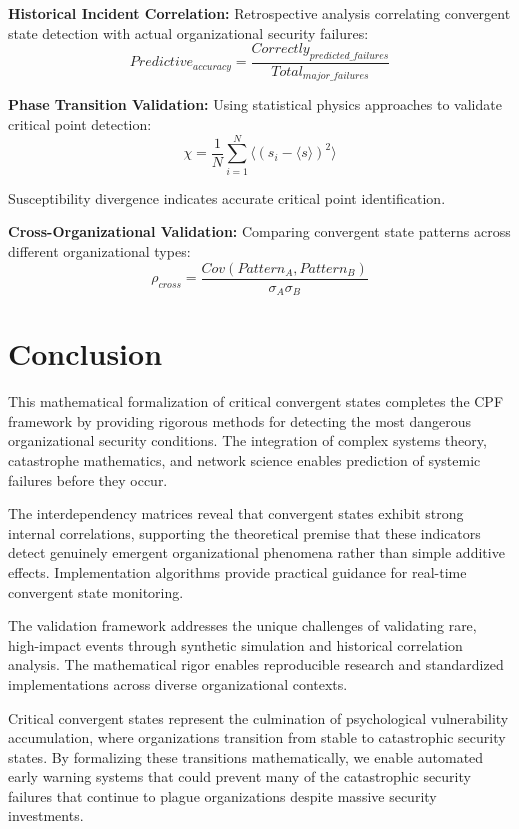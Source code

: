 \documentclass[11pt,a4paper]{article}
\begin{document}
\textbf{Historical Incident Correlation:}
Retrospective analysis correlating convergent state detection with actual organizational security failures:
\begin{equation}
Predictive_{accuracy} = \frac{Correctly_{predicted\_failures}}{Total_{major\_failures}}
\end{equation}

\textbf{Phase Transition Validation:}
Using statistical physics approaches to validate critical point detection:
\begin{equation}
\chi = \frac{1}{N} \sum_{i=1}^{N} \langle (s_i - \langle s \rangle)^2 \rangle
\end{equation}

Susceptibility divergence indicates accurate critical point identification.

\textbf{Cross-Organizational Validation:}
Comparing convergent state patterns across different organizational types:
\begin{equation}
\rho_{cross} = \frac{Cov(Pattern_A, Pattern_B)}{\sigma_A \sigma_B}
\end{equation}

\section{Conclusion}

This mathematical formalization of critical convergent states completes the CPF framework by providing rigorous methods for detecting the most dangerous organizational security conditions. The integration of complex systems theory, catastrophe mathematics, and network science enables prediction of systemic failures before they occur.

The interdependency matrices reveal that convergent states exhibit strong internal correlations, supporting the theoretical premise that these indicators detect genuinely emergent organizational phenomena rather than simple additive effects. Implementation algorithms provide practical guidance for real-time convergent state monitoring.

The validation framework addresses the unique challenges of validating rare, high-impact events through synthetic simulation and historical correlation analysis. The mathematical rigor enables reproducible research and standardized implementations across diverse organizational contexts.

Critical convergent states represent the culmination of psychological vulnerability accumulation, where organizations transition from stable to catastrophic security states. By formalizing these transitions mathematically, we enable automated early warning systems that could prevent many of the catastrophic security failures that continue to plague organizations despite massive security investments.
\end{document}
